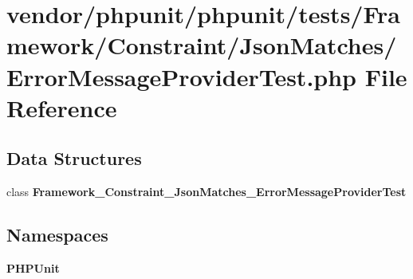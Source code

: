 \section{vendor/phpunit/phpunit/tests/\+Framework/\+Constraint/\+Json\+Matches/\+Error\+Message\+Provider\+Test.php File Reference}
\label{_error_message_provider_test_8php}
\subsection*{Data Structures}
\begin{DoxyCompactItemize}
\item 
class {\bf Framework\+\_\+\+Constraint\+\_\+\+Json\+Matches\+\_\+\+Error\+Message\+Provider\+Test}
\end{DoxyCompactItemize}
\subsection*{Namespaces}
\begin{DoxyCompactItemize}
\item 
 {\bf P\+H\+P\+Unit}
\end{DoxyCompactItemize}
